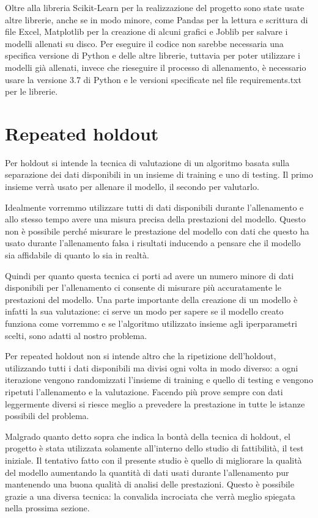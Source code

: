 \documentclass[a4paper,12pt]{report}
\begin{document}
Oltre alla libreria Scikit-Learn per la realizzazione del progetto sono state
usate altre librerie, anche se in modo minore, come Pandas per la lettura e
scrittura di file Excel, Matplotlib per la creazione di alcuni grafici e Joblib
per salvare i modelli allenati su disco. Per eseguire il codice non sarebbe
necessaria una specifica versione di Python e delle altre librerie, tuttavia per
poter utilizzare i modelli già allenati, invece che rieseguire il processo di
allenamento, è necessario usare la versione 3.7 di Python e le versioni
specificate nel file requirements.txt per le librerie.


\section{Repeated holdout}
Per holdout si intende la tecnica di valutazione di un algoritmo basata sulla
separazione dei dati disponibili in un insieme di training e uno di testing. Il
primo insieme verrà usato per allenare il modello, il secondo per valutarlo.

Idealmente vorremmo utilizzare tutti di dati disponibili durante l'allenamento e
allo stesso tempo avere una misura precisa della prestazioni del modello. Questo
non è possibile perché misurare le prestazione del modello con dati che questo
ha usato durante l'allenamento falsa i risultati inducendo a pensare che il
modello sia affidabile di quanto lo sia in realtà.

Quindi per quanto questa tecnica ci porti ad avere un numero minore di dati
disponibili per l'allenamento ci consente di misurare più accuratamente le
prestazioni del modello. Una parte importante della creazione di un modello è
infatti la sua valutazione: ci serve un modo per sapere se il modello creato
funziona come vorremmo e se l'algoritmo utilizzato insieme agli iperparametri
scelti, sono adatti al nostro problema.

Per repeated holdout non si intende altro che la ripetizione dell'holdout,
utilizzando tutti i dati disponibili ma divisi ogni volta in modo diverso: a
ogni iterazione vengono randomizzati l'insieme di training e quello di testing e
vengono ripetuti l'allenamento e la valutazione. Facendo più prove sempre con
dati leggermente diversi si riesce meglio a prevedere la prestazione in tutte le
istanze possibili del problema.

Malgrado quanto detto sopra che indica la bontà della tecnica di holdout, el
progetto è stata utilizzata solamente all'interno dello studio di fattibilità,
il test iniziale. Il tentativo fatto con il presente studio è quello di
migliorare la qualità del modello aumentando la quantità di dati usati
durante l'allenamento pur mantenendo una buona qualità di analisi delle
prestazioni. Questo è possibile grazie a una diversa tecnica: la convalida
incrociata che verrà meglio spiegata nella prossima sezione.
\end{document}
